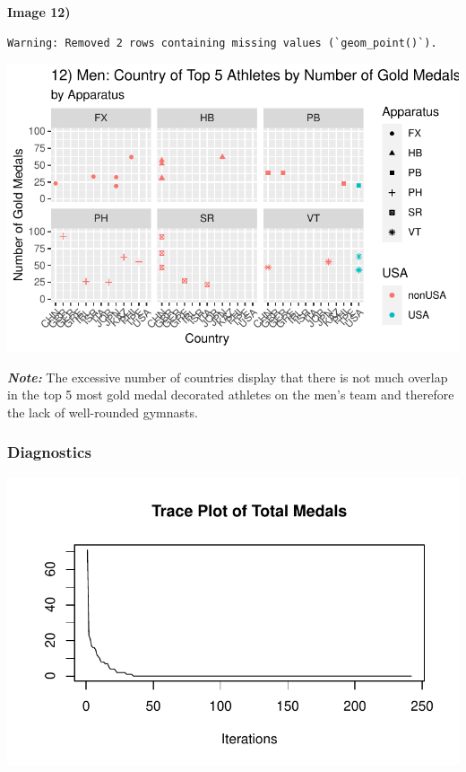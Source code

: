 \documentclass[
  letterpaper,
  DIV=11,
  numbers=noendperiod]{scrartcl}
\begin{document}
\textbf{Image 12)}

\begin{verbatim}
Warning: Removed 2 rows containing missing values (`geom_point()`).
\end{verbatim}

\includegraphics{Main_files/figure-pdf/unnamed-chunk-11-1.pdf}

\textbf{\emph{Note:}} The excessive number of countries display that
there is not much overlap in the top 5 most gold medal decorated
athletes on the men's team and therefore the lack of well-rounded
gymnasts.

\hypertarget{diagnostics}{%
\subsubsection{Diagnostics}\label{diagnostics}}

\includegraphics{Main_files/figure-pdf/unnamed-chunk-12-1.pdf}
\end{document}
